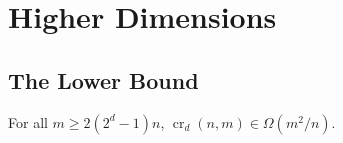 \documentclass{patmorin}
\DeclareMathOperator{\x}{x}
\DeclareMathOperator{\crs}{cr}
\DeclareMathOperator{\len}{len}
\DeclareMathOperator{\skp}{skip}
\begin{document}
%
%
%

\section{Higher Dimensions}

\subsection{The Lower Bound}

\begin{thm}
  For all $m\ge 2(2^d-1)n$, $\crs_d(n,m)\in\Omega(m^2/n)$.
\end{thm}
\end{document}
